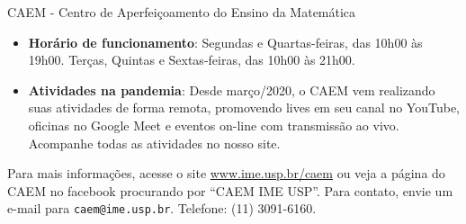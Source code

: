 \begin{secao}{CAEM - Centro de Aperfeiçoamento do Ensino da Matemática}
\begin{itemize}
\item \textbf{Horário de funcionamento}: Segundas e Quartas-feiras,
  das 10h00 às 19h00. Terças, Quintas e Sextas-feiras, das 10h00 às
  21h00.
  
\item \textbf{Atividades na pandemia}: Desde março/2020, o CAEM vem realizando
suas atividades de forma remota, promovendo lives em seu canal no YouTube,
oficinas no Google Meet e eventos on-line com transmissão ao vivo. Acompanhe
todas as atividades no nosso site.
  
\end{itemize}

Para mais informações, acesse o site \url{www.ime.usp.br/caem} ou veja
a página do CAEM no facebook procurando por ``CAEM IME USP''. Para
contato, envie um e-mail para {\tt caem@ime.usp.br}. Telefone:
(11) 3091-6160.


\end{secao}
